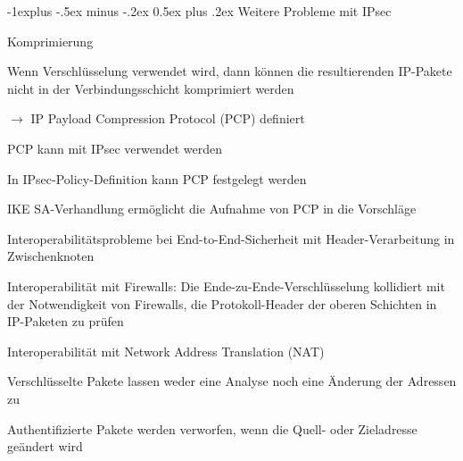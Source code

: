 \documentclass[a4paper]{article}
\makeatletter
\renewcommand{\subsection}{\@startsection{subsection}{2}{0mm}%
 {-1explus -.5ex minus -.2ex}%
 {0.5ex plus .2ex}%
 {\normalfont\normalsize\bfseries}}
\makeatother
\begin{document}
\begin{multicols}{3}
      \subsection{Weitere Probleme mit IPsec}
      \begin{itemize*}
            \item Komprimierung
            \begin{itemize*}
                  \item Wenn Verschlüsselung verwendet wird, dann können die resultierenden IP-Pakete nicht in der Verbindungsschicht komprimiert werden%
                  \item[$\rightarrow$] IP Payload Compression Protocol (PCP) definiert
                  \item PCP kann mit IPsec verwendet werden
                  \item In IPsec-Policy-Definition kann PCP festgelegt werden
                  \item IKE SA-Verhandlung ermöglicht die Aufnahme von PCP in die Vorschläge
            \end{itemize*}
            \item Interoperabilitätsprobleme bei End-to-End-Sicherheit mit Header-Verarbeitung in Zwischenknoten
            \begin{itemize*}
                  \item Interoperabilität mit Firewalls: Die Ende-zu-Ende-Verschlüsselung kollidiert mit der Notwendigkeit von Firewalls, die Protokoll-Header der oberen Schichten in IP-Paketen zu prüfen
                  \item Interoperabilität mit Network Address Translation (NAT)
                  \begin{itemize*}
                        \item Verschlüsselte Pakete lassen weder eine Analyse noch eine Änderung der Adressen zu
                        \item Authentifizierte Pakete werden verworfen, wenn die Quell- oder Zieladresse geändert wird
                  \end{itemize*}
            \end{itemize*}
      \end{itemize*}


\end{multicols}
\end{document}
